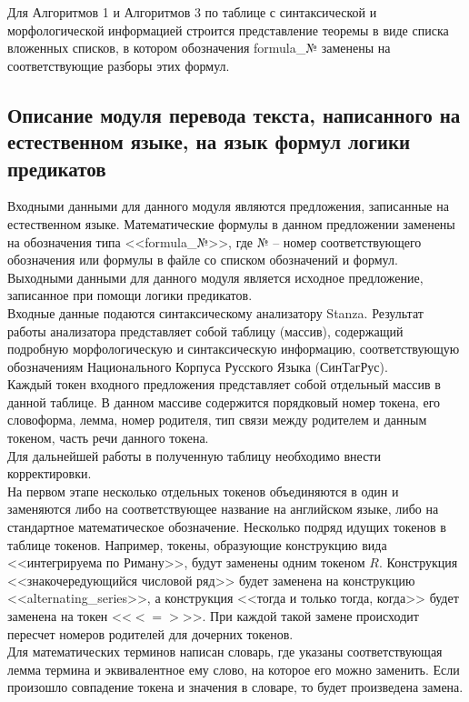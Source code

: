 \documentclass[12pt]{article}
\begin{document}
Для Алгоритмов 1 и Алгоритмов 3 по таблице с синтаксической и морфологической информацией строится представление теоремы в виде списка вложенных списков, в котором обозначения formula\_№ заменены на соответствующие разборы этих формул. 

\subsection{Описание модуля перевода текста, написанного на естественном языке, на язык формул логики предикатов}
Входными данными для данного модуля являются предложения, записанные на естественном языке.  Математические формулы в данном предложении заменены на обозначения типа <<formula\_№>>, где № -- номер соответствующего обозначения или формулы в файле со списком обозначений и формул. Выходными данными для данного модуля является исходное предложение, записанное при помощи логики предикатов.\\

Входные данные подаются синтаксическому анализатору Stanza. Результат работы анализатора представляет собой  таблицу (массив), содержащий подробную морфологическую и синтаксическую информацию, соответствующую обозначениям Национального Корпуса Русского Языка (СинТагРус).\\

Каждый токен входного предложения представляет собой отдельный массив в данной таблице. В данном массиве содержится порядковый номер токена, его словоформа, лемма, номер родителя, тип связи между родителем и данным токеном, часть речи данного токена. \\

Для дальнейшей работы в полученную таблицу необходимо внести корректировки. \\

На первом этапе несколько отдельных токенов объединяются в один и заменяются либо на соответствующее название на английском языке, либо на стандартное математическое обозначение. Несколько подряд идущих токенов в таблице токенов. Например, токены, образующие конструкцию вида <<интегрируема по Риману>>, будут заменены одним токеном $R$. Конструкция <<знакочередующийся числовой ряд>> будет заменена на конструкцию <<alternating\_series>>, а конструкция <<тогда и только тогда, когда>> будет заменена на токен <<$<=>$>>. При каждой такой замене происходит пересчет номеров родителей для дочерних токенов.\\

Для математических терминов написан словарь, где указаны соответствующая лемма термина и эквивалентное ему слово, на которое его можно заменить. Если произошло совпадение токена и значения в словаре, то будет произведена замена.  \\
\end{document}
